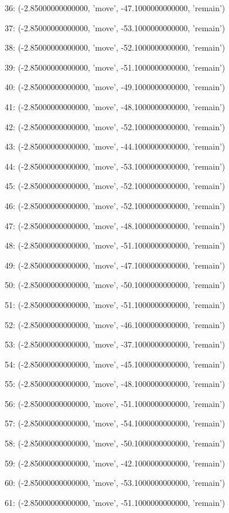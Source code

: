 36: (-2.85000000000000, 'move', -47.1000000000000, 'remain')


37: (-2.85000000000000, 'move', -53.1000000000000, 'remain')


38: (-2.85000000000000, 'move', -52.1000000000000, 'remain')


39: (-2.85000000000000, 'move', -51.1000000000000, 'remain')


40: (-2.85000000000000, 'move', -49.1000000000000, 'remain')


41: (-2.85000000000000, 'move', -48.1000000000000, 'remain')


42: (-2.85000000000000, 'move', -52.1000000000000, 'remain')


43: (-2.85000000000000, 'move', -44.1000000000000, 'remain')


44: (-2.85000000000000, 'move', -53.1000000000000, 'remain')


45: (-2.85000000000000, 'move', -52.1000000000000, 'remain')


46: (-2.85000000000000, 'move', -52.1000000000000, 'remain')


47: (-2.85000000000000, 'move', -48.1000000000000, 'remain')


48: (-2.85000000000000, 'move', -51.1000000000000, 'remain')


49: (-2.85000000000000, 'move', -47.1000000000000, 'remain')


50: (-2.85000000000000, 'move', -50.1000000000000, 'remain')


51: (-2.85000000000000, 'move', -51.1000000000000, 'remain')


52: (-2.85000000000000, 'move', -46.1000000000000, 'remain')


53: (-2.85000000000000, 'move', -37.1000000000000, 'remain')


54: (-2.85000000000000, 'move', -45.1000000000000, 'remain')


55: (-2.85000000000000, 'move', -48.1000000000000, 'remain')


56: (-2.85000000000000, 'move', -51.1000000000000, 'remain')


57: (-2.85000000000000, 'move', -54.1000000000000, 'remain')


58: (-2.85000000000000, 'move', -50.1000000000000, 'remain')


59: (-2.85000000000000, 'move', -42.1000000000000, 'remain')


60: (-2.85000000000000, 'move', -53.1000000000000, 'remain')


61: (-2.85000000000000, 'move', -51.1000000000000, 'remain')


